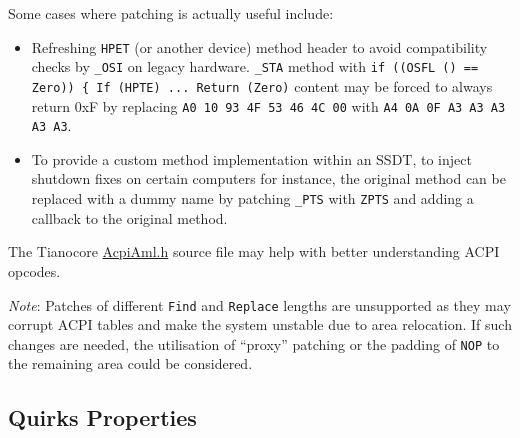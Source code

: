 \documentclass[]{article}
\makeatletter
\renewcommand{\label}[1]{%
\zref@wrapper@immediate{\oldlabel{#1}}}  %
\makeatother
\begin{document}
Some cases where patching is actually useful include:

\begin{itemize}
\item
  Refreshing \texttt{HPET} (or another device) method header to avoid
  compatibility checks by \texttt{\_OSI} on legacy hardware. \texttt{\_STA}
  method with \texttt{if ((OSFL () == Zero)) \{ If (HPTE)  ...  Return (Zero)}
  content may be forced to always return 0xF by replacing
  \texttt{A0 10 93 4F 53 46 4C 00} with \texttt{A4 0A 0F A3 A3 A3 A3 A3}.
\item
  To provide a custom method implementation within an SSDT, to inject
  shutdown fixes on certain computers for instance, the original method can
  be replaced with a dummy name by patching \texttt{\_PTS} with \texttt{ZPTS}
  and adding a callback to the original method.
\end{itemize}

The Tianocore \href{https://github.com/acidanthera/audk/blob/master/MdePkg/Include/IndustryStandard/AcpiAml.h}{AcpiAml.h} source file may help with better understanding ACPI opcodes.

\emph{Note}: Patches of different \texttt{Find} and \texttt{Replace} lengths
are unsupported as they may corrupt ACPI tables and make the system unstable
due to area relocation. If such changes are needed, the utilisation of ``proxy''
patching or the padding of \texttt{NOP} to the remaining area could be considered.

\subsection{Quirks Properties}\label{acpipropsquirks}
\end{document}

